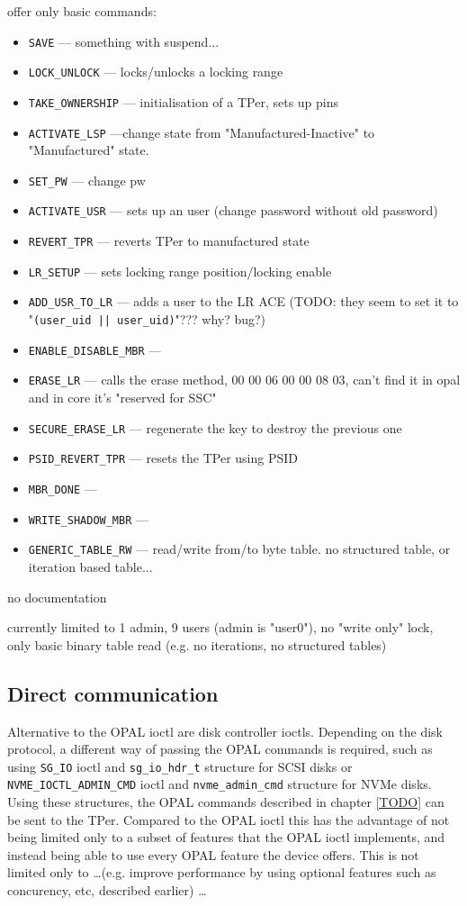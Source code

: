 offer only basic commands: 
\begin{itemize}
\item \verb|SAVE| --- something with suspend...
\item \verb|LOCK_UNLOCK| --- locks/unlocks a locking range
\item \verb|TAKE_OWNERSHIP| --- initialisation of a TPer, sets up pins
\item \verb|ACTIVATE_LSP| ---change state from "Manufactured-Inactive" to "Manufactured" state. 
\item \verb|SET_PW| --- change pw
\item \verb|ACTIVATE_USR| --- sets up an user (change password without old password)
\item \verb|REVERT_TPR| --- reverts TPer to manufactured state
\item \verb|LR_SETUP| --- sets locking range position/locking enable
\item \verb|ADD_USR_TO_LR| --- adds a user to the LR ACE (TODO: they seem to set it to "\verb#(user_uid || user_uid)#"??? why? bug?)
\item \verb|ENABLE_DISABLE_MBR| --- 
\item \verb|ERASE_LR| --- calls the erase method, 00 00 06 00 00 08 03, can't find it in opal and in core it's "reserved for SSC"
\item \verb|SECURE_ERASE_LR| --- regenerate the key to destroy the previous one
\item \verb|PSID_REVERT_TPR| --- resets the TPer using PSID
\item \verb|MBR_DONE| --- 
\item \verb|WRITE_SHADOW_MBR| --- 
\item \verb|GENERIC_TABLE_RW| --- read/write from/to byte table. no structured table, or iteration based table...
\end{itemize}

no documentation

currently limited to 1 admin, 9 users (admin is "user0"), no "write only" lock, only basic binary table read (e.g. no iterations, no structured tables)

\subsection{Direct communication}

Alternative to the OPAL ioctl are disk controller ioctls. Depending on the disk protocol, a different way of passing the OPAL commands is required, such as using \verb|SG_IO| ioctl and \verb|sg_io_hdr_t| structure for SCSI disks or \verb|NVME_IOCTL_ADMIN_CMD| ioctl and \verb|nvme_admin_cmd| structure for NVMe disks. Using these structures, the OPAL commands described in chapter \ref{TODO} can be sent to the TPer. Compared to the OPAL ioctl this has the advantage of not being limited only to a subset of features that the OPAL ioctl implements, and instead being able to use every OPAL feature the device offers. This is not limited only to \dots (e.g. improve performance by using optional features such as concurency, etc, described earlier) \dots

